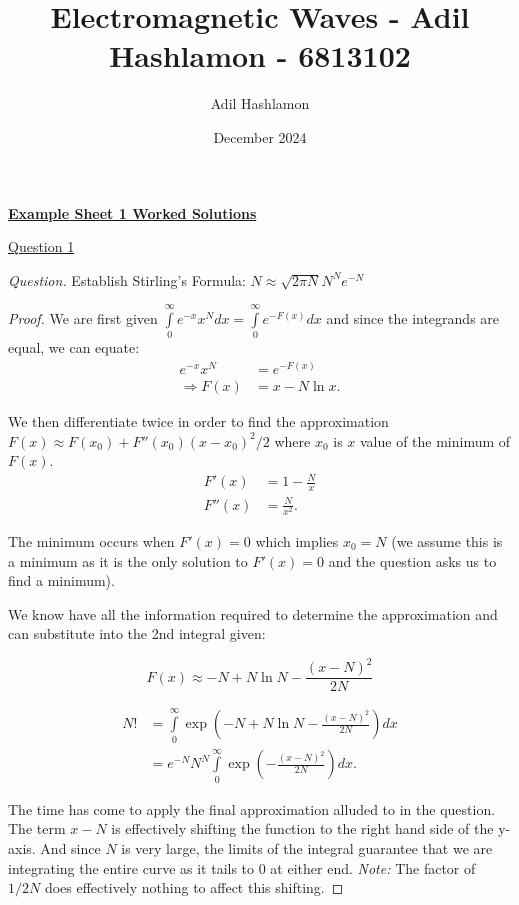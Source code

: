 \documentclass[11pt]{article}
\title{Electromagnetic Waves - Adil Hashlamon - 6813102}
\author{Adil Hashlamon}
\date{December 2024}
\begin{document}
\underline{\textbf{Example Sheet 1 Worked Solutions}}

\underline{Question 1}

\textit{Question.} Establish Stirling's Formula: $N \approx \sqrt{2\pi N }N^N e^{-N}$

\begin{proof}
We are first given $\int\limits_{0}^{\infty}e^{-x} x^N dx = \int\limits_{0}^{\infty}e^{-F(x)} dx$ and since the integrands are equal, we can equate:
\begin{equation}
    \begin{aligned}
        e^{-x}x^N &= e^{-F(x)} \\
        \Rightarrow F(x) &= x - N\ln x.
    \end{aligned}
\end{equation}

We then differentiate twice in order to find the approximation $F(x) \approx F(x_0) + F''(x_0) (x-x_0)^2/2$ where $x_0$ is $x$ value of the minimum of $F(x)$.
\begin{equation}
    \begin{aligned}
        F'(x) &= 1- \frac{N}{x} \\
        F''(x) &= \frac{N}{x^2}.
    \end{aligned}
\end{equation}

The minimum occurs when $F'(x)=0$ which implies $x_0 = N$ (we assume this is a minimum as it is the only solution to $F'(x)=0$ and the question asks us to find a minimum).

We know have all the information required to determine the approximation and can substitute into the 2nd integral given:

\begin{equation}
    F(x) \approx -N + N \ln  N - \frac{(x-N)^2}{2N}
\end{equation}

\begin{equation}
    \begin{aligned}
        N! &= \int\limits_{0}^{\infty} \exp\left(-N + N \ln  N - \frac{(x-N)^2}{2N}\right) dx \\
        & = e^{-N} N^N \int\limits_{0}^{\infty} \exp\left( - \frac{(x-N)^2}{2N}\right) dx.
    \end{aligned}
\end{equation}

The time has come to apply the final approximation alluded to in the question. The term $x-N$ is effectively shifting the function to the right hand side of the y-axis. And since $N$ is very large, the limits of the integral guarantee that we are integrating the entire curve as it tails to $0$ at either end. \textit{Note: }The factor of $1/2N$ does effectively nothing to affect this shifting.


\end{proof}
\end{document}
